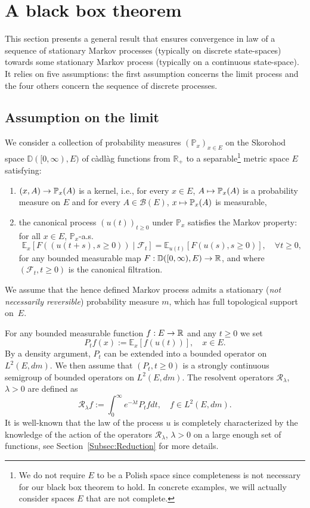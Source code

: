 \documentclass[AHL,Unicode,longabstracts]{cedram}
\theoremstyle{plain}
\newcommand{\bbD}{\mathbb{D}}
\newcommand{\cB}{\mathcal{B}}
\newcommand{\cF}{\mathcal{F}}
\newcommand{\cR}{\mathcal{R}}
\newcommand{\R}{\mathbb{R}}
\newcommand{\E}{\mathbb{E}}
\renewcommand{\P}{\mathbb{P}}
\let\oldforall\forall
\renewcommand*{\forall}{\mathrel{\oldforall}}
\renewcommand*{\to}{\mathchoice{\longrightarrow}{\rightarrow}{\rightarrow}{\rightarrow}}
\let\oldmapsto\mapsto
\renewcommand*{\mapsto}{\mathchoice{\longmapsto}{\oldmapsto}{\oldmapsto}{\oldmapsto}}
\begin{document}
\section{A black box theorem}\label{sec:ageneral}
This section presents a general result that ensures convergence in law of a sequence of stationary Markov processes (typically on discrete state-spaces) towards some stationary Markov process (typically on a continuous state-space). It relies on five assumptions: the first assumption concerns the limit process and the four others concern the sequence of discrete processes.

\subsection*{Assumption on the limit}

We consider a collection of probability measures $(\P_x)_{x\in E}$ on the Skorohod space $\bbD([0,\infty),E)$ of càdlàg functions from $\R_+$ to a separable\footnote{We do not require $E$ to be a Polish space since completeness is not necessary for our black box theorem to hold. In concrete examples, we will actually consider spaces $E$ that are not complete.} metric space $E$ satisfying:
\begin{enumerate}
\item $(x,A) \to \P_x(A)$ is a kernel, i.e., for every $x \in E$, $A\mapsto \P_x(A)$ is a probability measure on $E$ and for every $A\in\cB(E)$, $x\mapsto \P_x(A)$ is measurable,
\item the canonical process $(u(t))_{t\geq 0}$ under $\P_x$ satisfies the Markov property: for all $x\in E$, $\P_x$-a.s.
\[
\E_x[F((u(t+s),s\ge 0)) \mid  \cF_t] = \E_{u(t)}[F(u(s),s\ge 0)],\quad \forall t\ge 0,
\]
for any bounded measurable map $F:\bbD([0,\infty),E)\to\R$, and where $(\cF_t,t\ge 0)$ is the canonical filtration.
\end{enumerate}
We assume that the hence defined Markov process admits a stationary (\emph{not necessarily reversible}) probability measure $m$, which has full topological support on~$E$.

For any bounded measurable function $f:E\to \R$ and any $t\ge 0$ we set
\[
P_t f(x) := \E_x[f(u(t))],\quad x\in E.
\]
By a density argument, $P_t$ can be extended into a bounded operator on $L^2(E,dm)$. We then assume that $(P_t,t\ge 0)$ is a strongly continuous semigroup of bounded operators on $L^2(E,dm)$. The resolvent operators $\cR_\lambda$, $\lambda > 0$ are defined as
\[
\cR_\lambda f := \int_0^\infty e^{-\lambda t} P_t f dt,\quad f\in L^2(E,dm).
\]
It is well-known that the law of the process $u$ is completely characterized by the knowledge of the action of the operators $\cR_\lambda$, $\lambda > 0$ on a large enough set of functions, see Section~\ref{Subsec:Reduction} for more details.
\end{document}
